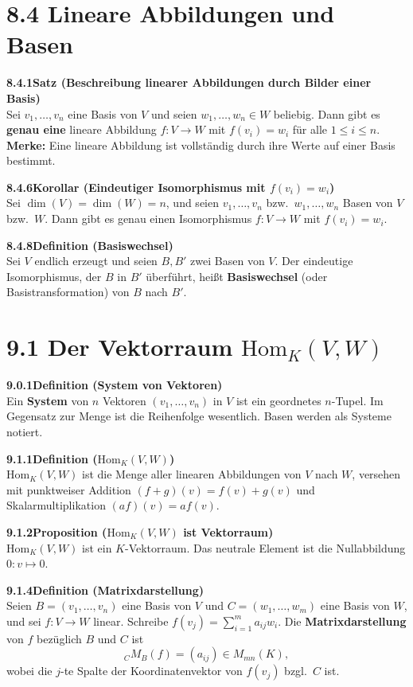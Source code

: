 \documentclass[a4paper,12pt]{article}
\newcommand{\gentry}[3]{%
  \noindent\textbf{#1\quad #2}\nopagebreak\\[0.2em]
  #3\par\smallskip
}
\begin{document}
\section*{8.4 \quad Lineare Abbildungen und Basen}

\gentry{8.4.1}{Satz (Beschreibung linearer Abbildungen durch Bilder einer Basis)}{%
  Sei $v_1,\ldots,v_n$ eine Basis von $V$ und seien $w_1,\ldots,w_n \in W$
  beliebig. Dann gibt es \textbf{genau eine} lineare Abbildung $f: V \to W$
  mit $f(v_i) = w_i$ für alle $1 \le i \le n$.
  \smallskip\\
  \textbf{Merke:} Eine lineare Abbildung ist vollständig durch ihre Werte auf
  einer Basis bestimmt.
}

\gentry{8.4.6}{Korollar (Eindeutiger Isomorphismus mit $f(v_i)=w_i$)}{%
  Sei $\dim(V) = \dim(W) = n$, und seien $v_1,\ldots,v_n$ bzw.\ $w_1,\ldots,w_n$
  Basen von $V$ bzw.\ $W$. Dann gibt es genau einen Isomorphismus $f: V \to W$
  mit $f(v_i) = w_i$.
}

\gentry{8.4.8}{Definition (Basiswechsel)}{%
  Sei $V$ endlich erzeugt und seien $B, B'$ zwei Basen von $V$. Der eindeutige
  Isomorphismus, der $B$ in $B'$ überführt, heißt \textbf{Basiswechsel} (oder
  Basistransformation) von $B$ nach $B'$.
}

\section*{9.1 \quad Der Vektorraum $\mathrm{Hom}_K(V,W)$}

\gentry{9.0.1}{Definition (System von Vektoren)}{%
  Ein \textbf{System} von $n$ Vektoren $(v_1,\ldots,v_n)$ in $V$ ist ein
  geordnetes $n$-Tupel. Im Gegensatz zur Menge ist die Reihenfolge wesentlich.
  Basen werden als Systeme notiert.
}

\gentry{9.1.1}{Definition ($\mathrm{Hom}_K(V,W)$)}{%
  $\mathrm{Hom}_K(V,W)$ ist die Menge aller linearen Abbildungen von $V$ nach
  $W$, versehen mit punktweiser Addition $(f+g)(v) = f(v)+g(v)$ und
  Skalarmultiplikation $(af)(v) = af(v)$.
}

\gentry{9.1.2}{Proposition ($\mathrm{Hom}_K(V,W)$ ist Vektorraum)}{%
  $\mathrm{Hom}_K(V,W)$ ist ein $K$-Vektorraum.
  Das neutrale Element ist die Nullabbildung $0: v \mapsto 0$.
}

\gentry{9.1.4}{Definition (Matrixdarstellung)}{%
  Seien $B = (v_1,\ldots,v_n)$ eine Basis von $V$ und
  $C = (w_1,\ldots,w_m)$ eine Basis von $W$, und sei $f: V \to W$ linear.
  Schreibe $f(v_j) = \sum_{i=1}^m a_{ij} w_i$. Die \textbf{Matrixdarstellung}
  von $f$ bezüglich $B$ und $C$ ist
  \[
    {}_C M_B(f) = (a_{ij}) \in M_{mn}(K),
  \]
  wobei die $j$-te Spalte der Koordinatenvektor von $f(v_j)$ bzgl.\ $C$ ist.
}
\end{document}
